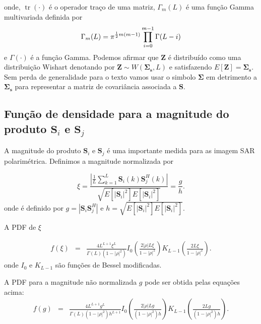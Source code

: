 \documentclass[conference]{IEEEtran}
\DeclareMathOperator{\traco}{tr}
\begin{document}
onde, $\traco(\cdot)$ é o operador traço de uma matriz, $\Gamma_m(L)$ é uma função Gamma multivariada definida por
\begin{equation}\label{cap_acf_10}
	\Gamma_m(L)=\pi^{\frac{1}{2}m(m-1)} \prod_{i=0}^{m-1}\Gamma(L-i) \\
\end{equation}
e $\Gamma(\cdot)$ é a função Gamma. Podemos afirmar que $\mathbf{Z}$ é distribuído como uma distribuição Wishart denotando por $\mathbf{Z}\sim W(\mathbf{\Sigma_{s}}, L)$ e satisfazendo $E[\mathbf{Z}]=\mathbf{\Sigma_{s}}$. Sem perda de generalidade para o texto vamos usar o simbolo $\mathbf{\Sigma}$ em detrimento a $\mathbf{\Sigma_{s}}$ para representar a matriz de covariância associada a $\mathbf{S}$.

\subsection{Função de densidade para a magnitude do produto $\mathbf{S}_i$ e $\mathbf{S}_j$}
A magnitude do produto $\mathbf{S}_i$ e $\mathbf{S}_j$ é uma importante medida para as imagem SAR polarimétrica. Definimos a magnitude normalizada por 

\begin{equation}
	\xi = \frac{\left|\frac{1}{L} \sum_{k=1}^L\mathbf{S}_i(k)\mathbf{S}_j^H(k) \right|}{\sqrt{E[|\mathbf{S}_i|^2]E[|\mathbf{S}_i|^2]}}=\frac{g}{h}.
\end{equation}
onde é definido por $g=|\mathbf{S}_i\mathbf{S}_j^H|$ e $h=\sqrt{E[|\mathbf{S}_i|^2]E[|\mathbf{S}_i|^2]}$.

A PDF de $\xi$

\begin{equation}
\begin{array}{ccc}
	f(\xi)&=&\frac{4L^{L+1}\xi^L}{\Gamma(L)(1-|\rho|^2)}I_0\left(\frac{2|\rho|L\xi}{1-|\rho|^2}\right)K_{L-1}\left(\frac{2L\xi}{1-|\rho|^2}\right).
		\end{array}
\end{equation}
onde $I_0$ e $K_{L-1}$ são funções de Bessel modificadas.

A PDF para a magnitude não normalizada $g$ pode ser obtida pelas equações acima:
\begin{equation}
\begin{array}{ccc}
	f(g)&=&\frac{4L^{L+1}g^L}{\Gamma(L)(1-|\rho|^2)h^{L+1}}I_0\left(\frac{2|\rho|Lg}{(1-|\rho|^2)h}\right)K_{L-1}\left(\frac{2Lg}{(1-|\rho|^2)h}\right).
		\end{array}
\end{equation}
\end{document}
